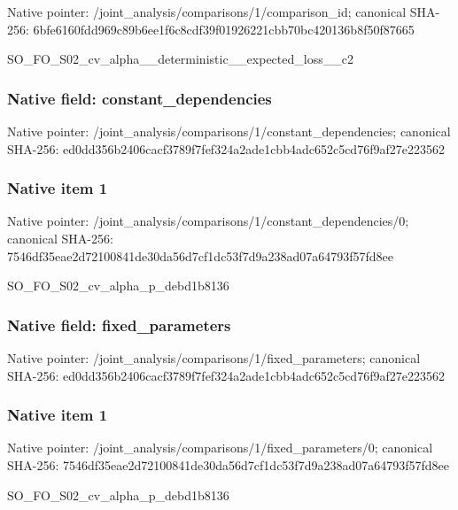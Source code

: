 \documentclass[10pt,a4paper]{article}
\begin{document}
Native pointer: /joint\_analysis/comparis\allowbreak{}ons/1/comparison\_id; canonical SHA-256: 6bfe6160fdd969c89b6ee1f6\allowbreak{}c8cdf39f01926221cbb70bc4\allowbreak{}20136b8f50f87665


SO\_FO\_S02\_cv\_alpha\_\_dete\allowbreak{}rministic\_\_expected\_loss\allowbreak{}\_\_c2


\subsubsection{Native field: constant\_dependencies}


Native pointer: /joint\_analysis/comparis\allowbreak{}ons/1/constant\_dependenc\allowbreak{}ies; canonical SHA-256: ed0dd356b2406cacf3789f7f\allowbreak{}ef324a2ade1cbb4adc652c5c\allowbreak{}d76f9af27e223562



\subsubsection{Native item 1}


Native pointer: /joint\_analysis/comparis\allowbreak{}ons/1/constant\_dependenc\allowbreak{}ies/0; canonical SHA-256: 7546df35eae2d72100841de3\allowbreak{}0da56d7cf1dc53f7d9a238ad\allowbreak{}07a64793f57fd8ee


SO\_FO\_S02\_cv\_alpha\_p\_debd1b8136


\subsubsection{Native field: fixed\_parameters}


Native pointer: /joint\_analysis/comparis\allowbreak{}ons/1/fixed\_parameters; canonical SHA-256: ed0dd356b2406cacf3789f7f\allowbreak{}ef324a2ade1cbb4adc652c5c\allowbreak{}d76f9af27e223562



\subsubsection{Native item 1}


Native pointer: /joint\_analysis/comparis\allowbreak{}ons/1/fixed\_parameters/0; canonical SHA-256: 7546df35eae2d72100841de3\allowbreak{}0da56d7cf1dc53f7d9a238ad\allowbreak{}07a64793f57fd8ee


SO\_FO\_S02\_cv\_alpha\_p\_debd1b8136
\end{document}
